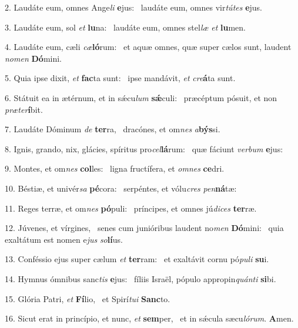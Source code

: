 2. Laudáte eum, omnes Ange\textit{li} \textbf{e}jus: \ast\  laudáte eum, omnes vir\textit{tú}\textit{tes} \textbf{e}jus.\

3. Laudáte eum, sol \textit{et} \textbf{lu}na: \ast\  laudáte eum, omnes stel\textit{læ} \textit{et} \textbf{lu}men.\

4. Laudáte eum, cæli \textit{cæ}\textbf{ló}rum: \ast\  et aquæ omnes, quæ super cælos sunt, laudent \textit{no}\textit{men} \textbf{Dó}mini.\

5. Quia ipse dixit, \textit{et} \textbf{fac}ta sunt: \ast\  ipse mandávit, \textit{et} \textit{cre}\textbf{á}ta sunt.\

6. Státuit ea in ætérnum, et in sǽcu\textit{lum} \textbf{sǽ}culi: \ast\  præcéptum pósuit, et non \textit{præ}\textit{ter}\textbf{í}bit.\

7. Laudáte Dóminum \textit{de} \textbf{ter}ra, \ast\  dracónes, et om\textit{nes} \textit{a}\textbf{býs}si.\

8. Ignis, grando, nix, glácies, spíritus pro\textit{cel}\textbf{lá}rum: \ast\  quæ fáciunt \textit{ver}\textit{bum} \textbf{e}jus:\

9. Montes, et om\textit{nes} \textbf{col}les: \ast\  ligna fructífera, et \textit{om}\textit{nes} \textbf{ce}dri.\

10. Béstiæ, et univér\textit{sa} \textbf{pé}cora: \ast\  serpéntes, et vólu\textit{cres} \textit{pen}\textbf{ná}tæ:\

11. Reges terræ, et om\textit{nes} \textbf{pó}puli: \ast\  príncipes, et omnes jú\textit{di}\textit{ces} \textbf{ter}ræ.\

12. Júvenes, et vírgines, \dag\  senes cum junióribus laudent no\textit{men} \textbf{Dó}mini: \ast\  quia exaltátum est nomen e\textit{jus} \textit{so}\textbf{lí}us.\

13. Conféssio ejus super cælum \textit{et} \textbf{ter}ram: \ast\  et exaltávit cornu pó\textit{pu}\textit{li} \textbf{su}i.\

14. Hymnus ómnibus sanc\textit{tis} \textbf{e}jus: \ast\  fíliis Israël, pópulo appropin\textit{quán}\textit{ti} \textbf{si}bi.\

15. Glória Patri, \textit{et} \textbf{Fí}lio, \ast\  et Spirí\textit{tu}\textit{i} \textbf{Sanc}to.\

16. Sicut erat in princípio, et nunc, \textit{et} \textbf{sem}per, \ast\  et in sǽcula sæcu\textit{ló}\textit{rum}. \textbf{A}men.\

